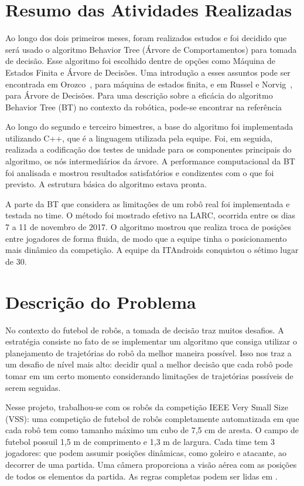 \documentclass[a4paper,12pt]{article}
\begin{document}
\section{Resumo das Atividades Realizadas}
\label{secao:atividades_realizadas}

Ao longo dos dois primeiros meses, foram realizados estudos e foi decidido que será usado o algoritmo Behavior Tree (Árvore de Comportamentos) para tomada de decisão. Esse algoritmo foi escolhido dentre de opções como Máquina de Estados Finita e Árvore de Decisões. Uma introdução a esses assuntos pode ser encontrada em Orozco~\cite{orozcomaquinas}, para máquina de estados finita, e em Russel e Norvig~\cite{decision_tree}, para Árvore de Decisões. Para uma descrição sobre a eficácia do algoritmo Behavior Tree (BT) no contexto da robótica, pode-se encontrar na referência \cite{behavior_tree_robotics}

Ao longo do segundo e terceiro bimestres, a base do algoritmo foi implementada utilizando C++, que é a linguagem utilizada pela equipe. Foi, em seguida, realizada a codificação dos testes de unidade para os componentes principais do algoritmo, os nós intermediários da árvore. A performance computacional da BT foi analisada e mostrou resultados satisfatórios e condizentes com o que foi previsto. A estrutura básica do algoritmo estava pronta.

A parte da BT que considera as limitações de um robô real foi implementada e testada no time. 
O método  foi mostrado efetivo na LARC, ocorrida entre os dias 7 a 11 de novembro de 2017. O algoritmo mostrou que realiza troca de posições entre jogadores de forma fluida, de modo que a equipe tinha o posicionamento mais dinâmico da competição. A equipe da ITAndroids conquistou o sétimo lugar de 30.

\section{Descrição do Problema}
\label{secao:enunciado_problema}

No contexto do futebol de robôs, a tomada de decisão traz muitos desafios. A estratégia consiste no fato de se implementar um algoritmo que consiga utilizar o planejamento de trajetórias do robô da melhor maneira possível. Isso nos traz a um desafio de nível mais alto: decidir qual a melhor decisão que cada robô pode tomar em um certo momento considerando limitações de trajetórias possíveis de serem seguidas.

Nesse projeto, trabalhou-se com os robôs da competição IEEE Very Small Size (VSS): uma competição de futebol de robôs completamente automatizada em que cada robô tem como tamanho máximo um cubo de 7,5 cm de aresta. O campo de futebol possuil 1,5 m de comprimento e 1,3 m de largura. Cada time tem 3 jogadores: que podem assumir posições dinâmicas, como goleiro e atacante, ao decorrer de uma partida. Uma câmera proporciona a visão aérea com as posições de todos os elementos da partida. As regras completas podem ser lidas em \cite{cbr2008}.
\end{document}
